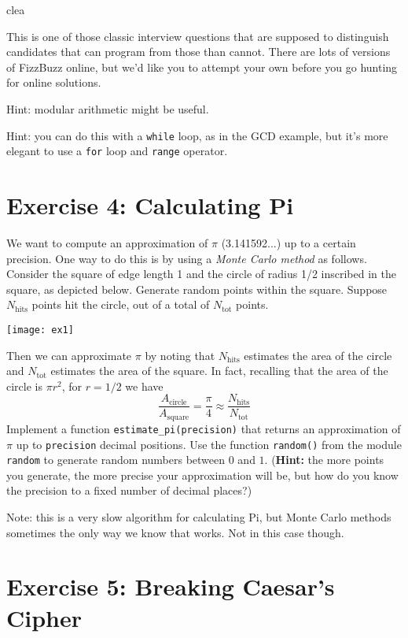 clea\documentclass{article}
\begin{document}
This is one of those classic interview questions that are supposed to
distinguish candidates that can program from those than cannot.  There
are lots of versions of FizzBuzz online, but we'd like you to attempt
your own before you go hunting for online solutions.

\vspace{0.1in}\noindent Hint: modular arithmetic might be useful.

\vspace{0.1in}\noindent Hint: you can do this with a \texttt{while} loop, as in the GCD example, but it's
more elegant to use a \texttt{for} loop and \texttt{range} operator.

\newpage
\section*{Exercise 4: Calculating Pi}

We want to compute an approximation of $\pi$ (3.141592...) up to a
 certain precision. One way to do this is by using a \emph{Monte Carlo
 method} as follows. Consider the square of edge length 1 and the
 circle of radius 1/2 inscribed in the square, as depicted
 below. Generate random points within the square. Suppose
 $N_{\text{hits}}$ points hit the circle, out of a total of
 $N_{\text{tot}}$ points.


\begin{center}
\texttt{[image: ex1]}
\end{center}

Then we can approximate $\pi$ by noting that $N_{\text{hits}}$
 estimates the area of the circle and $N_{\text{tot}}$ estimates the
 area of the square. In fact, recalling that the area of the circle is
 $\pi r^2$, for $r=1/2$ we have
\[
	\frac{A_{\text{circle}}}{A_{\text{square}}} = \frac{\pi}{4} \approx \frac{N_{\text{hits}}}{N_{\text{tot}}}
\]
%
Implement a function \texttt{estimate\_pi(precision)} that returns an
 approximation of $\pi$ up to \texttt{precision} decimal
 positions. Use the function \texttt{random()} from the module
 \texttt{random} to generate random numbers between $0$ and
 $1$. (\textbf{Hint:} the more points you generate, the more precise
 your approximation will be, but how do you know the precision to a fixed number of decimal places?)

 Note: this is a very slow algorithm for calculating Pi, but Monte
 Carlo methods sometimes the only way we know that works.  Not in this
 case though.


\section*{Exercise 5: Breaking Caesar's Cipher}
\end{document}
